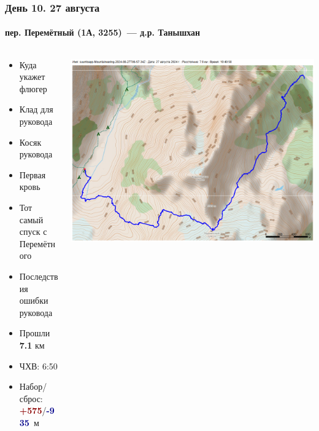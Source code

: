 	\begin{frame}
	\frametitle{День 10. 27 августа}
	\framesubtitle{\textbf{пер. Перемётный (1А, 3255)}~--- д.р. Танышхан} %
	\begin{columns}[c] %
		\begin{column}{0.55\textwidth} %
			\begin{itemize}
				\item Куда укажет флюгер
				\item Клад для руковода
				\item Косяк руковода
				\item Первая кровь
				\item Тот самый спуск с Перемётного
				\item Последствия ошибки руковода
				\item Прошли \textbf{7.1} км
				\item ЧХВ: 6:50
				\item Набор/сброс: \textcolor{darkred}{\textbf{+575}}/\textcolor{darkblue}{\textbf{-935}}~м
			\end{itemize}
			
		\end{column}
		\begin{column}{0.45\textwidth} %
			\centering
			\includegraphics[width=\linewidth]{../pics/mini_maps/27}
		\end{column}
	\end{columns}
\end{frame}

